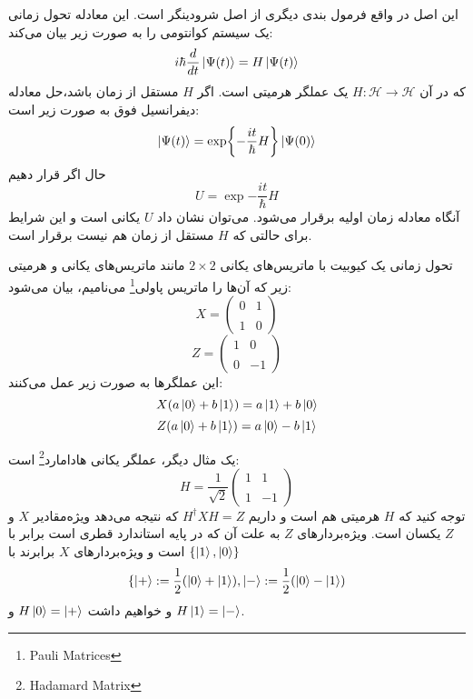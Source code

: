   این اصل در واقع فرمول بندی دیگری از اصل شرودینگر است. این معادله تحول زمانی یک سیستم کوانتومی را به صورت زیر بیان می‌کند: 
  \begin{equation}
  	i\hbar\frac{d}{dt}\ket{\Psi (t)} = H\ket{\Psi (t)}
  \end{equation}
  که در آن $H: \mathcal{H} \to \mathcal{H}$ یک عملگر هرمیتی است. اگر $H$ مستقل از زمان باشد،حل معادله دیفرانسیل فوق به صورت زیر است: 
  \begin{equation}
  	\ket{\Psi (t)} = \exp{-\frac{it}{\hbar}H}\ket{\Psi (0)}
  \end{equation}
  حال اگر قرار دهیم 
 \begin{equation}
 	U = \exp{-\frac{it}{\hbar}H}
 \end{equation}
 آنگاه معادله زمان اولیه برقرار می‌شود. می‌توان نشان داد $U$ یکانی است و این شرایط برای حالتی که $H$ مستقل از زمان هم نیست برقرار است. 
 
\begin{example}
  تحول زمانی یک کیوبیت با ماتریس‌های یکانی $2 \times 2$ مانند ماتریس‌های یکانی و هرمیتی زیر که آن‌ها را ماتریس پاولی\footnote{Pauli Matrices} می‌نامیم، بیان می‌شود: 
 \begin{equation}
 	X = \begin{pmatrix}
 		0 & 1 \\ \\
 		1 & 0 
 	\end{pmatrix}
 \end{equation}
 \begin{equation}
 	Z = \begin{pmatrix}
 		1 & 0 \\ \\
 		0 & -1 
 	\end{pmatrix}
 \end{equation}
 این عملگرها به صورت زیر عمل می‌کنند: 
 \begin{equation}
 	X(a\ket{0} + b\ket{1}) = a\ket{1} + b\ket{0}
 \end{equation}
  \begin{equation}
 	Z(a\ket{0} + b\ket{1}) = a\ket{0} - b\ket{1}
 \end{equation}
 \end{example}

 یک مثال دیگر، عملگر یکانی هادامارد\footnote{Hadamard Matrix} است: 
 \begin{equation}
 	H = \frac{1}{\sqrt{2}}\begin{pmatrix}
 		1 & 1 \\ \\
 		1 & -1 
 	\end{pmatrix}
 \end{equation}
 توجه کنید که $H$ هرمیتی هم است و داریم $H^{\dagger}XH = Z$ که نتیجه می‌دهد ویژه‌مقادیر $X$ و $Z$ یکسان است. ویژه‌بردارهای $Z$ به علت آن‌ که در پایه استاندارد قطری است برابر با $\{\ket{1}, \ket{0} \}$ است و ویژه‌بردارهای $X$ برابرند با 
 \begin{equation}
 	\{ \ket{+} := \frac{1}{2}(\ket{0} +\ket{1}), \ket{-} := \frac{1}{2}(\ket{0} - \ket{1})
 \end{equation}
 و خواهیم داشت $H\ket{0} = \ket{+}$ و $H\ket{1} = \ket{-}$.
 
